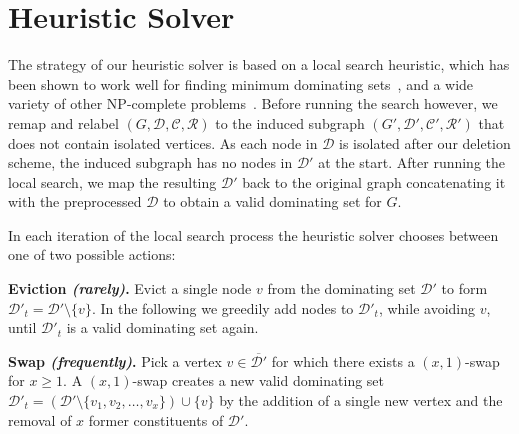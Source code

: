 \documentclass[a4paper, USenglish, cleveref, autoref, thm-restate, noalgorithm2e]{socg-lipics-v2021}
\newcommand{\domset}{\ensuremath{\mathcal D}\xspace}
\newcommand{\cov}{\ensuremath{\mathcal C}\xspace}
\newcommand{\red}{\ensuremath{\mathcal R}\xspace}
\newcommand{\rem}{\ensuremath{\mathcal V'}\xspace}
\newcommand{\cdomset}{\ensuremath{\overline{\mathcal D}}\xspace}
\newcommand{\ccov}{\ensuremath{\overline{\mathcal C}}\xspace}
\newcommand{\cred}{\ensuremath{\overline{\mathcal R}}\xspace}
\newcommand{\crem}{\ensuremath{\overline{\mathcal V'}}\xspace}
\begin{document}
\section{Heuristic Solver}\label{sec:heuristic}
The strategy of our heuristic solver is based on a local search heuristic, which has been shown to work well for finding minimum dominating sets~\cite{DBLP:journals/kbs/ZhuZWSL24}, and a wide variety of other NP-complete problems~\cite{DBLP:journals/jair/CaiSLS13,DBLP:conf/compgeom/MustafaR09}.
Before running the search however, we remap and relabel $(G, \domset, \cov, \red)$ to the induced subgraph $(G', \domset', \cov', \red')$ that does not contain isolated vertices.
As each node in $\domset$ is isolated after our deletion scheme, the induced subgraph has no nodes in $\domset'$ at the start.
After running the local search, we map the resulting $\domset'$ back to the original graph concatenating it with the preprocessed $\domset$ to obtain a valid dominating set for $G$. 

In each iteration of the local search process the heuristic solver chooses between one of two possible actions:
\renewcommand{\domset}{\ensuremath{\mathcal D'}\xspace}
\renewcommand{\cov}{\ensuremath{\mathcal C'}\xspace}
\renewcommand{\red}{\ensuremath{\mathcal R'}\xspace}
\renewcommand{\rem}{\ensuremath{\mathcal V''}\xspace}

\renewcommand{\cdomset}{\ensuremath{\overline{\mathcal D'}}\xspace}
\renewcommand{\ccov}{\ensuremath{\overline{\mathcal C'}}\xspace}
\renewcommand{\cred}{\ensuremath{\overline{\mathcal R'}}\xspace}
\renewcommand{\crem}{\ensuremath{\overline{\mathcal V''}}\xspace}
\medskip

\noindent
\textbf{Eviction \textit{(rarely)}.} 
Evict a single node $v$ from the dominating set $\domset$ to form $\domset_t=\domset \setminus \{v\}$.
In the following we greedily add nodes to $\domset_t$, while avoiding $v$, until $\domset_t$ is a valid dominating set again.
\medskip


\noindent
\textbf{Swap \textit{(frequently)}.}
Pick a vertex $v \in \cdomset$ for which there exists a $(x,1)$-swap for $x\geq 1$.
%
A $(x,1)$-swap creates a new valid dominating set $\domset_t = (\domset \setminus \{v_1,v_2,\ldots,v_x\}) \cup \{v\}$ by the addition of a single new vertex and the removal of $x$ former constituents of $\domset$.
\end{document}
